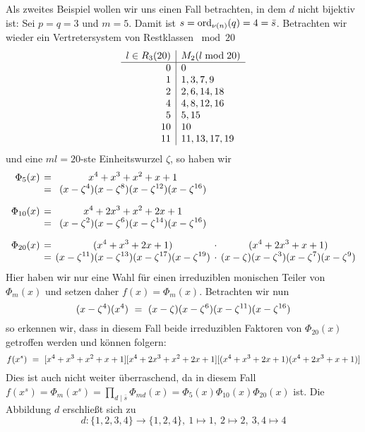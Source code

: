 \begin{beispiel}
  Als zweites Beispiel wollen wir uns einen Fall betrachten, in dem $d$ nicht
  bijektiv ist:
  Sei $p=q=3$ und $m=5$. Damit ist $s = \operatorname{ord}_{\nu(n)}(q) = 4 = \bar s$.
  Betrachten wir wieder ein Vertretersystem von Restklassen ${}\bmod 20$
  \[\begin{array}[t]{r|l}
    l \in R_3(20) & M_2(l \bmod 20) \\\hline
    0 & 0 \\
    1 & 1, 3, 7, 9 \\
    2 & 2, 6, 14, 18 \\
    4 & 4, 8, 12, 16 \\
    5 & 5, 15 \\
    10& 10 \\
    11& 11, 13, 17, 19 
    \end{array}\]
  und eine $ml = 20$-ste Einheitswurzel $\zeta$, so haben wir
  \[\setlength{\arraycolsep}{2pt}\everymath{\displaystyle}
    \begin{array}{rcccc} 
      \Phi_5(x)&=& x^4 + x^3 + x^2 + x + 1\\
      &=& (x-\zeta^4)(x-\zeta^{8})(x-\zeta^{12})(x-\zeta^{16}) \\[10pt]
      \Phi_{10}(x) &=& x^{4} + 2 x^{3} + x^{2} + 2 x + 1 \\
      &=& (x-\zeta^2)(x-\zeta^6)(x-\zeta^{14})(x-\zeta^{16})\\[10pt]
      \Phi_{20}(x) &=& 
        (x^{4} + x^{3} + 2 x + 1) &\cdot& (x^{4} + 2 x^{3} + x + 1) \\
      &=& (x-\zeta^{11})(x-\zeta^{13})(x-\zeta^{17})(x-\zeta^{19}) &\cdot&
        (x-\zeta)(x-\zeta^{3})(x-\zeta^{7})(x-\zeta^{9})
    \end{array}\]
  Hier haben wir nur eine Wahl für einen irreduziblen monischen Teiler von
  $\Phi_m(x)$ und setzen daher $f(x) = \Phi_m(x)$.
  Betrachten wir nun 
  \[ (x -\zeta^4)(x^4) \ =\  (x-\zeta)(x-\zeta^6)(x-\zeta^{11})
    (x-\zeta^{16})\]
  so erkennen wir, dass in diesem Fall beide irreduziblen Faktoren von
  $\Phi_{20}(x)$ getroffen werden und können folgern:
  \[ f(x^s) \ =\  [x^4 + x^3 + x^2 + x + 1]
    [x^{4} + 2 x^{3} + x^{2} + 2 x + 1]
    [(x^{4} + x^{3} + 2 x + 1) (x^{4} + 2 x^{3} + x + 1)]\]
  Dies ist auch nicht weiter überraschend, da in diesem Fall
  $f(x^s) = \Phi_m(x^s) = \prod_{d\mid \bar s} \Phi_{md}(x) = 
  \Phi_5(x)\Phi_{10}(x)\Phi_{20}(x)$ ist.
  Die Abbildung $d$ erschließt sich zu
  \[ d: \{1,2,3,4\} \to \{1,2,4\},\ 1\mapsto 1,\ 2\mapsto 2,\ 3,4\mapsto 4\]
\end{beispiel}


